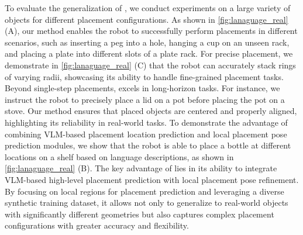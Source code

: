 To evaluate the generalization of \ourmethod, we conduct experiments on a large variety of objects for different placement configurations. As shown in \autoref{fig:lanaguage_real} (A), our method enables the robot to successfully perform placements in different scenarios, such as inserting a peg into a hole, hanging a cup on an unseen rack, and placing a plate into different slots of a plate rack. For precise placement, we demonstrate in \autoref{fig:lanaguage_real} (C) that the robot can accurately stack rings of varying radii, showcasing its ability to handle fine-grained placement tasks. Beyond single-step placements, \ourmethod excels in long-horizon tasks. For instance, we instruct the robot to precisely place a lid on a pot before placing the pot on a stove. Our method ensures that placed objects are centered and properly aligned, highlighting its reliability in real-world tasks. To demonstrate the advantage of combining VLM-based placement location prediction and local placement pose prediction modules, we show that the robot is able to place a bottle at different locations on a shelf based on language descriptions, as shown in \autoref{fig:lanaguage_real} (B). The key advantage of \ourmethod lies in its ability to integrate VLM-based high-level placement prediction with local placement pose refinement. By focusing on local regions for placement prediction and leveraging a diverse synthetic training dataset, it allows \ourmethod not only to generalize to real-world objects with significantly different geometries but also captures complex placement configurations with greater accuracy and flexibility.

